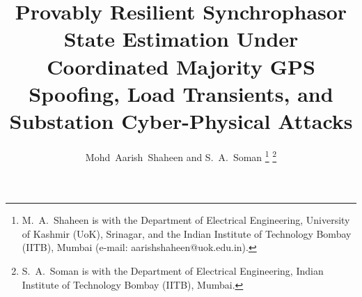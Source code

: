 \documentclass[journal,twoside]{IEEEtran}
\begin{document}


\title{Provably Resilient Synchrophasor State Estimation Under Coordinated Majority GPS Spoofing, Load Transients, and Substation Cyber-Physical Attacks}

\author{Mohd~Aarish~Shaheen and S.~A.~Soman%
\thanks{M.~A.~Shaheen is with the Department of Electrical Engineering, University of Kashmir (UoK), Srinagar, and the Indian Institute of Technology Bombay (IITB), Mumbai (e-mail: aarishshaheen@uok.edu.in).}%
\thanks{S.~A.~Soman is with the Department of Electrical Engineering, Indian Institute of Technology Bombay (IITB), Mumbai.}}

\maketitle
\end{document}
